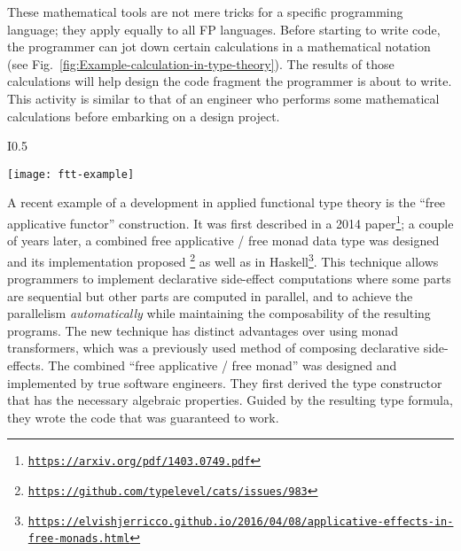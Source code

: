 These mathematical tools are not mere tricks for a specific programming
language; they apply equally to all FP languages. Before starting
to write code, the programmer can jot down certain calculations in
a mathematical notation (see Fig.\ \ref{fig:Example-calculation-in-type-theory}).
The results of those calculations will help design the code fragment
the programmer is about to write. This activity is similar to that
of an engineer who performs some mathematical calculations before
embarking on a design project. \begin{wrapfigure}{I}{0.5\textwidth}%
\begin{centering}
{\footnotesize{}\vspace{0.25\baselineskip}
\texttt{[image: ftt-example]}\vspace{-0.25\baselineskip}
}{\footnotesize\par}
\par\end{centering}
{\footnotesize{}\caption{A programmer performs a derivation before writing Haskell code.\label{fig:Example-calculation-in-type-theory}}
}{\footnotesize\par}

\vspace{-0.5\baselineskip}
\end{wrapfigure}%
 

A recent example of a development in applied functional type theory
is the ``free applicative functor'' construction. It was first described
in a 2014 paper\footnote{\texttt{\href{https://arxiv.org/pdf/1403.0749.pdf}{https://arxiv.org/pdf/1403.0749.pdf}}};
a couple of years later, a combined free applicative / free monad
data type was designed and its implementation proposed \footnote{\texttt{\href{https://github.com/typelevel/cats/issues/983}{https://github.com/typelevel/cats/issues/983}}}
as well as in Haskell\footnote{\texttt{\href{https://elvishjerricco.github.io/2016/04/08/applicative-effects-in-free-monads.html}{https://elvishjerricco.github.io/2016/04/08/applicative-effects-in-free-monads.html}}}.
This technique allows programmers to implement declarative side-effect
computations where some parts are sequential but other parts are computed
in parallel, and to achieve the parallelism \emph{automatically} while
maintaining the composability of the resulting programs. The new technique
has distinct advantages over using monad transformers, which was a
previously used method of composing declarative side-effects. The
combined ``free applicative / free monad'' was designed and implemented
by true software engineers. They first derived the type constructor
that has the necessary algebraic properties. Guided by the resulting
type formula, they wrote the code that was guaranteed to work.

